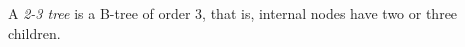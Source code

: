 \documentclass[12pt]{article}
\begin{document}
A \emph{2-3 tree} is a  B-tree of order 3, that is, internal nodes have two or three children.
\end{document}
